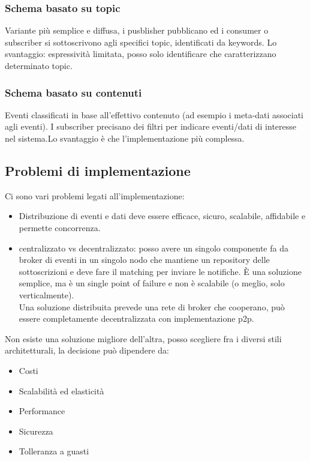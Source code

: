 \documentclass{article}
\begin{document}
\subsubsection{Schema basato su topic}
Variante più semplice e diffusa, i pusblisher pubblicano ed i consumer o subscriber si sottoscrivono agli specifici topic, identificati da keywords. Lo svantaggio: espressività limitata, posso solo identificare che caratterizzano determinato topic.
\subsubsection{Schema basato su contenuti}
Eventi classificati in base all'effettivo contenuto (ad esempio i meta-dati associati agli eventi). I subscriber precisano dei filtri per indicare eventi/dati di interesse nel sistema.Lo svantaggio è che l'implementazione più complessa.
\subsection{Problemi di implementazione}
Ci sono vari problemi legati all'implementazione:
\begin{itemize}
\item Distribuzione di eventi e dati deve essere efficace,  sicuro, scalabile, affidabile e permette concorrenza.
\item centralizzato vs decentralizzato: posso avere un singolo componente fa da broker di eventi in un singolo nodo che mantiene un repository delle sottoscrizioni e deve fare il matching per inviare le notifiche. È una soluzione semplice, ma è un single point of failure e non è scalabile (o meglio, solo verticalmente).\\Una soluzione distribuita prevede una rete di broker che cooperano, può essere completamente decentralizzata con implementazione p2p.
\end{itemize}
Non esiste una soluzione migliore dell'altra, posso scegliere fra i diversi stili architetturali, la decisione può dipendere da:
\begin{itemize}
\item Costi
\item Scalabilità ed elasticità
\item Performance
\item Sicurezza
\item Tolleranza a guasti
\end{itemize}
\end{document}
